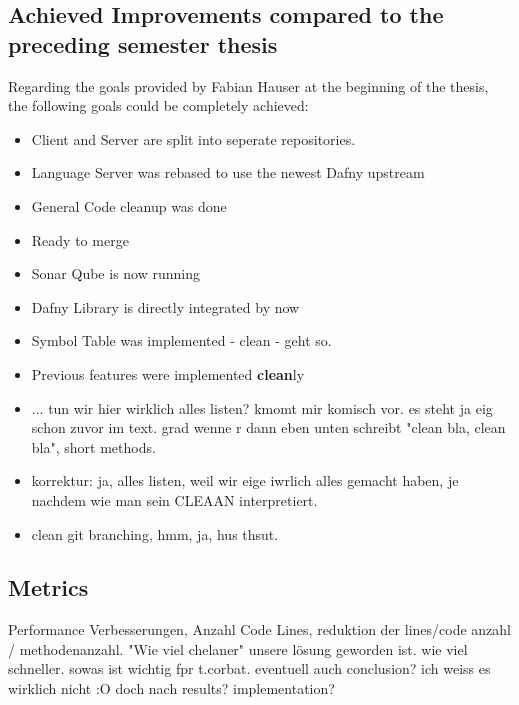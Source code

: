 \subsection{Achieved Improvements compared to the preceding semester thesis}
Regarding the goals provided by Fabian Hauser at the beginning of the thesis, the following goals could be completely achieved:
\begin{itemize}
    \item Client and Server are split into seperate repositories.
    \item Language Server was rebased to use the newest Dafny upstream
    \item General Code cleanup was done
    \item Ready to merge
    \item Sonar Qube is now running
    \item Dafny Library is directly integrated by now
    \item Symbol Table was implemented - clean - geht so.
    \item Previous features were implemented \textbf{clean}ly
    \item ... tun wir hier wirklich alles listen? kmomt mir komisch vor. es steht ja eig schon zuvor im text. grad wenne r dann eben unten schreibt "clean bla, clean bla", short methods.
    \item korrektur: ja, alles listen, weil wir eige iwrlich alles gemacht haben, je nachdem wie man sein CLEAAN interpretiert.
    \item clean git branching, hmm, ja, hus thsut.
\end{itemize}





\subsection{Metrics}

Performance Verbesserungen, Anzahl Code Lines, reduktion der lines/code anzahl / methodenanzahl.
"Wie viel chelaner" unsere lösung geworden ist. wie viel schneller. sowas ist wichtig fpr t.corbat.
eventuell auch conclusion? ich weiss es wirklich nicht :O doch nach results? implementation?
